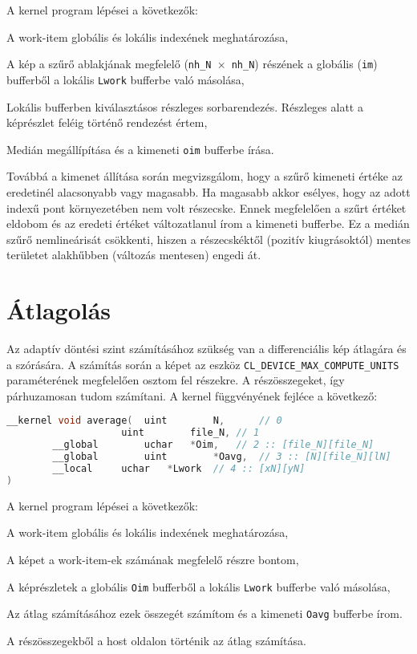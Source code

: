 \noindent A kernel program lépései a következők:
	\begin{enumerate*}
		\item A work-item globális és lokális indexének meghatározása,
		\item A kép a szűrő ablakjának megfelelő (\texttt{nh\_N $\times$ nh\_N}) részének a globális (\texttt{im}) bufferből a lokális
		\texttt{Lwork} bufferbe való másolása,
		\item Lokális bufferben kiválasztásos részleges sorbarendezés. Részleges alatt a képrészlet feléig történő rendezést értem,
		\item Medián megállípítása és a kimeneti \texttt{oim} bufferbe írása.
	\end{enumerate*}

\cbstart
\noindent Továbbá a kimenet állítása során megvizsgálom, hogy a szűrő kimeneti értéke az eredetinél alacsonyabb vagy magasabb. Ha magasabb
	akkor esélyes, hogy az adott indexű pont környezetében nem volt részecske. Ennek megfelelően a szűrt értéket
	eldobom és az eredeti értéket változatlanul írom a kimeneti bufferbe. Ez a medián szűrő nemlineárisát csökkenti, hiszen a
	részecskéktől (pozitív kiugrásoktól) mentes területet alakhűbben (változás mentesen) engedi át.
\cbend


\section{Átlagolás}
	Az adaptív döntési szint számításához szükség van a differenciális kép átlagára és a szórására.
	A számítás során a képet az eszköz \texttt{CL\_DEVICE\_MAX\_COMPUTE\_UNITS} paraméterének megfelelően osztom fel részekre. A
	részösszegeket, így párhuzamosan tudom számítani.
	\noindent A kernel függvényének fejléce a következő:
\begin{lstlisting}[language=C++]
__kernel void average(	uint		N,		// 0
					uint		file_N,	// 1					
		__global		uchar	*Oim,	// 2 :: [file_N][file_N]
		__global		uint		*Oavg,	// 3 :: [N][file_N][lN]
		__local		uchar	*Lwork	// 4 :: [xN][yN]
)
\end{lstlisting}
	
\noindent A kernel program lépései a következők:
	\begin{enumerate*}
		\item A work-item globális és lokális indexének meghatározása,
		\item A képet a work-item-ek számának megfelelő részre bontom,
		\item A képrészletek a globális \texttt{Oim} bufferből a lokális \texttt{Lwork} bufferbe való másolása,
		\item Az átlag számításához ezek összegét számítom és a kimeneti \texttt{Oavg} bufferbe írom.
	\end{enumerate*}
	A részösszegekből a host oldalon történik az átlag számítása.

